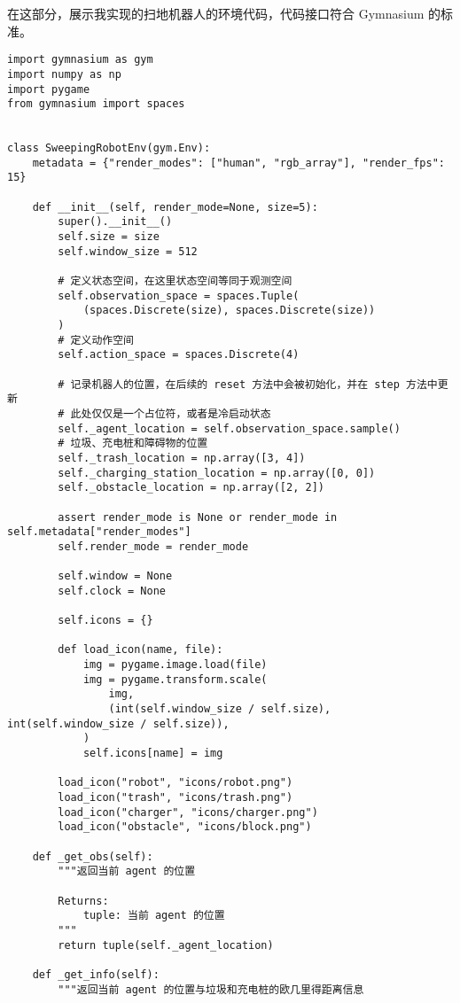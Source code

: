 在这部分，展示我实现的扫地机器人的环境代码，代码接口符合 Gymnasium 的标准。

\begin{verbatim}
import gymnasium as gym
import numpy as np
import pygame
from gymnasium import spaces


class SweepingRobotEnv(gym.Env):
    metadata = {"render_modes": ["human", "rgb_array"], "render_fps": 15}

    def __init__(self, render_mode=None, size=5):
        super().__init__()
        self.size = size
        self.window_size = 512

        # 定义状态空间，在这里状态空间等同于观测空间
        self.observation_space = spaces.Tuple(
            (spaces.Discrete(size), spaces.Discrete(size))
        )
        # 定义动作空间
        self.action_space = spaces.Discrete(4)

        # 记录机器人的位置，在后续的 reset 方法中会被初始化，并在 step 方法中更新
        # 此处仅仅是一个占位符，或者是冷启动状态
        self._agent_location = self.observation_space.sample()
        # 垃圾、充电桩和障碍物的位置
        self._trash_location = np.array([3, 4])
        self._charging_station_location = np.array([0, 0])
        self._obstacle_location = np.array([2, 2])

        assert render_mode is None or render_mode in self.metadata["render_modes"]
        self.render_mode = render_mode

        self.window = None
        self.clock = None

        self.icons = {}

        def load_icon(name, file):
            img = pygame.image.load(file)
            img = pygame.transform.scale(
                img,
                (int(self.window_size / self.size), int(self.window_size / self.size)),
            )
            self.icons[name] = img

        load_icon("robot", "icons/robot.png")
        load_icon("trash", "icons/trash.png")
        load_icon("charger", "icons/charger.png")
        load_icon("obstacle", "icons/block.png")

    def _get_obs(self):
        """返回当前 agent 的位置

        Returns:
            tuple: 当前 agent 的位置
        """
        return tuple(self._agent_location)

    def _get_info(self):
        """返回当前 agent 的位置与垃圾和充电桩的欧几里得距离信息


\end{verbatim}

